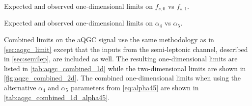 \begin{table}[h!]
  \begin{center}
  
    \caption{Expected and observed one-dimensional limits on $f_{s,0}$ vs $f_{s,1}$.}
    \label{tab:aqgc_combined_1d}

  \end{center}

\end{table}
\begin{table}[h!]
  \begin{center}
  
    \caption{Expected and observed one-dimensional limits on $\alpha_4$ vs $\alpha_5$.}
    \label{tab:aqgc_combined_1d_alpha45}

  \end{center}
\end{table}


Combined limits on the aQGC signal use the same methodology
as in \sec\ref{sec:aqgc_limit} except that the inputs from the semi-leptonic
channel, described in \sec\ref{sec:semilep}, are included as well.
The resulting one-dimensional limits are listed in \tab\ref{tab:aqgc_combined_1d}
while the two-dimensional limits are shown in \fig\ref{fig:aqgc_combined_2d}.
The combined one-dimensional limits 
when using the alternative $\alpha_4$ and $\alpha_5$ parameters from \eqn\eqref{eq:alpha45}
are shown in \tab\ref{tab:aqgc_combined_1d_alpha45}.



